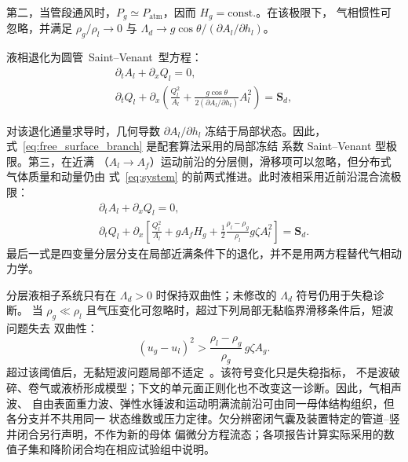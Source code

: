 第二，当管段通风时，$P_g\simeq P_{\mathrm{atm}}$，因而 $H_g=\mathrm{const.}$。在该极限下，
气相惯性可忽略，并满足 \mbox{$\rho_g/\rho_l\rightarrow0$} 与
\mbox{$\Lambda_d\rightarrow g\cos\theta/(\partial A_l/\partial h_l)$}。
\par
\begin{samepage}
\indent\mbox{液相退化为圆管 Saint--Venant 型方程：}
\begin{equation}
\begin{gathered}
\partial_tA_l+\partial_xQ_l=0,\\[3pt]
\partial_tQ_l+
\partial_x\!\left(\frac{Q_l^2}{A_l}
+\frac{g\cos\theta}{2(\partial A_l/\partial h_l)}A_l^2\right)=\mathbf S_d,
\end{gathered}
\label{eq:free_surface_branch}
\end{equation}
\end{samepage}
对该退化通量求导时，几何导数 $\partial A_l/\partial h_l$ 冻结于局部状态。因此，
式~\eqref{eq:free_surface_branch} 是配套算法采用的局部冻结
系数 Saint--Venant 型极限。第三，在近满
（$A_l\rightarrow A_f$）运动前沿的分层侧，滑移项可以忽略，但分布式气体质量和动量仍由
式~\eqref{eq:system} 的前两式推进。此时液相采用近前沿混合流极限：
\begin{equation}
\begin{gathered}
\partial_tA_l+\partial_xQ_l=0,\\[3pt]
\partial_tQ_l+
\partial_x\!\left[
\frac{Q_l^2}{A_l}+gA_fH_g
+\frac12\frac{\rho_l-\rho_g}{\rho_l}g\zeta A_l^2
\right]=\mathbf S_d.
\end{gathered}
\label{eq:near_front_branch}
\end{equation}
最后一式是四变量分层分支在局部近满条件下的退化，并不是用两方程替代气相动力学。

分层液相子系统只有在 $\Lambda_d>0$ 时保持双曲性；未修改的 $\Lambda_d$ 符号仍用于失稳诊断。
当 $\rho_g\ll\rho_l$ 且气压变化可忽略时，超过下列局部无黏临界滑移条件后，短波问题失去
双曲性：
\begin{equation}
(u_g-u_l)^2>
\frac{\rho_l-\rho_g}{\rho_g}\,g\zeta A_g.
\label{eq:critical_slip}
\end{equation}
超过该阈值后，无黏短波问题局部不适定~\cite{stuhmiller1977}。该符号变化只是失稳指标，
不是波破碎、卷气或液桥形成模型；下文的单元面正则化也不改变这一诊断。因此，气相声波、
自由表面重力波、弹性水锤波和运动明满流前沿可由同一母体结构组织，但各分支并不共用同一
状态维数或压力定律。欠分辨密闭气囊及装置特定的管道--竖井闭合另行声明，不作为新的母体
偏微分方程流态；各项报告计算实际采用的数值子集和降阶闭合均在相应试验组中说明。

